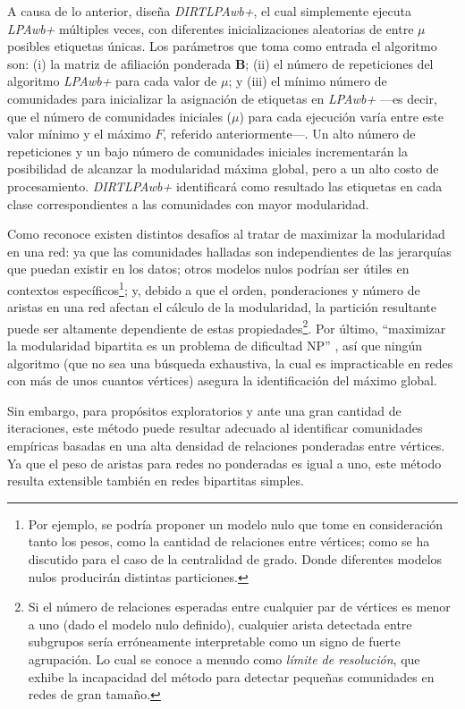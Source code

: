 \documentclass[letterpaper, 11pt]{book}
\theoremstyle{definition}
\theoremstyle{remark}
\begin{document}
A causa de lo anterior, \citet{2016_Beckett_ComunidadesBipatitas} diseña \emph{DIRTLPAwb+}, el cual simplemente ejecuta \emph{LPAwb+} múltiples veces, con diferentes inicializaciones aleatorias de entre $\mu$ posibles etiquetas únicas. 
Los parámetros que toma como entrada el algoritmo son: 
(i) la matriz de afiliación ponderada $\mathbf{B}$; 
(ii) el número de repeticiones del algoritmo \emph{LPAwb+} para cada valor de $\mu$; 
y (iii) el mínimo número de comunidades para inicializar la asignación de etiquetas en \emph{LPAwb+} ---es decir, que el número de comunidades iniciales ($\mu$) para cada ejecución varía entre este valor mínimo y el máximo $F$, referido anteriormente---. 
Un alto número de repeticiones y un bajo número de comunidades iniciales incrementarán la posibilidad de alcanzar la modularidad máxima global, pero a un alto costo de procesamiento. 
\emph{DIRTLPAwb+} identificará como resultado las etiquetas en cada clase correspondientes a las comunidades con mayor modularidad. 


Como reconoce \citet{2016_Beckett_ComunidadesBipatitas} existen distintos desafíos al tratar de maximizar la modularidad en una red: 
ya que las comunidades halladas son independientes de las jerarquías que puedan existir en los datos; 
otros modelos nulos podrían ser útiles en contextos específicos\footnote{
    Por ejemplo, se podría proponer un modelo nulo que tome en consideración tanto los pesos, como la cantidad de relaciones entre vértices; como se ha discutido para el caso de la centralidad de grado. 
    Donde diferentes modelos nulos producirán distintas particiones.
}; 
y, debido a que el orden, ponderaciones y número de aristas en una red afectan el cálculo de la modularidad, la partición resultante puede ser altamente dependiente de estas propiedades\footnote{
    Si el número de relaciones esperadas entre cualquier par de vértices es menor a uno (dado el modelo nulo definido), cualquier arista detectada entre subgrupos sería erróneamente interpretable como un signo de fuerte agrupación. 
    Lo cual se conoce a menudo como \emph{límite de resolución}, que exhibe la incapacidad del método para detectar pequeñas comunidades en redes de gran tamaño. 
}. 
Por último, ``maximizar la modularidad bipartita es un problema de dificultad NP'' \citep[15]{2016_Beckett_ComunidadesBipatitas}, así que ningún algoritmo (que no sea una búsqueda exhaustiva, la cual es impracticable en redes con más de unos cuantos vértices) asegura la identificación del máximo global. 


Sin embargo, para propósitos exploratorios y ante una gran cantidad de iteraciones, este método puede resultar adecuado al identificar comunidades empíricas basadas en una alta densidad de relaciones ponderadas entre vértices. 
Ya que el peso de aristas para redes no ponderadas es igual a uno, este método resulta extensible también en redes bipartitas simples. 
\end{document}
